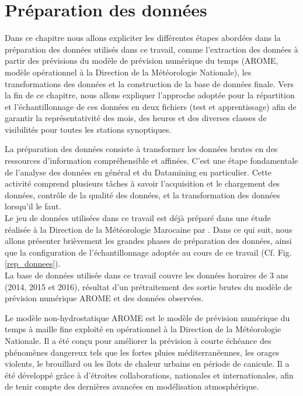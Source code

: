 \chapter[Préparation des données]{Préparation des données}
\label{dataprepation}
\chapterabstract
{
Dans ce chapitre nous allons expliciter les différentes étapes abordées dans la préparation des données utilisés dans ce travail, comme l’extraction des données à partir des prévisions du modèle de prévision numérique du temps (AROME, modèle opérationnel à la Direction de la Météorologie Nationale), les transformations des données et la construction de la base de données finale. Vers la fin de ce chapitre, nous allons expliquer l'approche adoptée pour la répartition et l’échantillonnage de ces données en deux fichiers (test et apprentissage) afin de garantir la représentativité des mois, des heures et des diverses classes de visibilités pour toutes les stations synoptiques.
}
\pagestyle{plain}

La préparation des données consiste à transformer les données brutes en des ressources d'information compréhensible et affinées. C'est une étape fondamentale de l'analyse des données en général et du Datamining en particulier. Cette activité comprend plusieurs tâches à savoir l'acquisition et le chargement des données, contrôle de la qualité des données, et la transformation des données lorsqu'il le faut. \\

Le jeu de données utilisées dans ce travail est déjà préparé dans une étude réalisée à la Direction de la Météorologie Marocaine par \citep{Ouagabi-Bari2018}. Dans ce qui suit, nous allons présenter brièvement les grandes phases de préparation des données, ainsi que la configuration de l'échantillonnage adoptée au cours de ce travail (Cf. Fig. \ref{rep_donnees}).\\

La base de données utilisée dans ce travail couvre les données horaires de 3 ans (2014, 2015 et 2016), résultat d’un prétraitement des sortie brutes du modèle de prévision numérique AROME et des données observées.\\

\begin{tcolorbox}
\footnotesize {
Le modèle non-hydrostatique AROME \citep{seity2011arome} est le modèle de prévision numérique du temps à maille fine exploité en opérationnel à la Direction de la Météorologie Nationale. Il a été conçu pour améliorer la prévision à courte échéance des phénomènes dangereux tels que les fortes pluies méditerranéennes, les orages violents, le brouillard ou les îlots de chaleur urbains en période de canicule. Il a été développé grâce à d’étroites collaborations, nationales et internationales, afin de tenir compte des dernières avancées en modélisation atmosphérique.
}
\end{tcolorbox}

